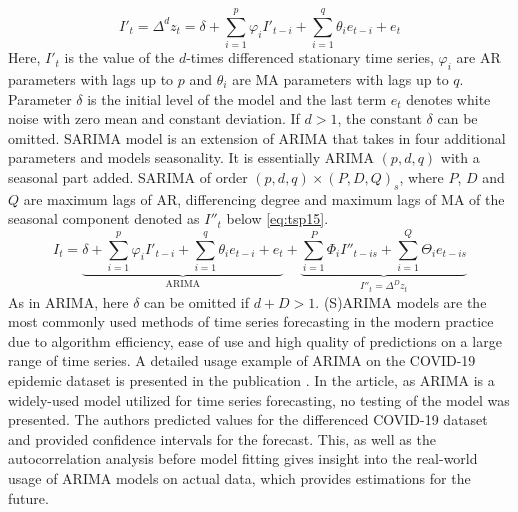 \documentclass[13pt, a4paper]{article}
\begin{document}
\begin{enumerate}
\begin{equation} \label{eq:tsp14}
I'_t = \Delta^d z_t = \delta + \sum_{i=1}^p \varphi_i I'_{t-i} + \sum_{i=1}^q \theta_i e_{t-i} + e_t
\end{equation}
Here, $I'_t$ is the value of the $d$-times differenced stationary time series, $\varphi_i$ are AR parameters with lags up to $p$ and $\theta_i$ are MA parameters with lags up to $q$. Parameter $\delta$ is the initial level of the model and the last term $e_t$ denotes white noise with zero mean and constant deviation. If $d>1$, the constant $\delta$ can be omitted.
SARIMA model is an extension of ARIMA that takes in four additional parameters and models seasonality. It is essentially ARIMA $(p,d,q)$ with a seasonal part added. SARIMA of order $(p,d,q)\times (P,D,Q)_s$, where $P$, $D$ and $Q$ are maximum lags of AR, differencing degree and maximum lags of MA of the seasonal component denoted as $I''_t$ below \ref{eq:tsp15}.
\begin{equation} \label{eq:tsp15}
I_t = \underbrace{\delta + \sum_{i=1}^p \varphi_i I'_{t-i} + \sum_{i=1}^q \theta_i e_{t-i} + e_t}_{\mathrm{ARIMA}} + \underbrace{\sum_{i=1}^P \Phi_i I''_{t-is} + \sum_{i=1}^Q \Theta_i e_{t-is}}_{I''_t = \Delta^D z_t}
\end{equation}
As in ARIMA, here $\delta$ can be omitted if $d+D > 1$. (S)ARIMA models are the most commonly used methods of time series forecasting in the modern practice due to algorithm efficiency, ease of use and high quality of predictions on a large range of time series.
A detailed usage example of ARIMA on the COVID-19 epidemic dataset is presented in the publication \cite{benvenuto2020application}. In the article, as ARIMA is a widely-used model utilized for time series forecasting, no testing of the model was presented. The authors predicted values for the differenced COVID-19 dataset and provided confidence intervals for the forecast. This, as well as the autocorrelation analysis before model fitting gives insight into the real-world usage of ARIMA models on actual data, which provides estimations for the future. 
\end{enumerate}
\end{document}
